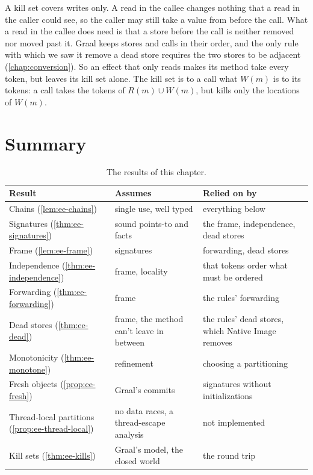 A kill set covers writes only. A read in the callee changes nothing that a
read in the caller could see, so the caller may still take a value from before
the call. What a read in the callee does need is that a store before the call
is neither removed nor moved past it. Graal keeps stores and calls in their
order, and the only rule with which we saw it remove a dead store requires the
two stores to be adjacent (\cref{chap:conversion}). So an effect that only reads
makes its method take every token, but leaves its kill set alone. The kill set
is to a call what $W(m)$ is to its tokens: a call takes the tokens of
$R(m) \cup W(m)$, but kills only the locations of $W(m)$.

\section{Summary}\label{sec:ee-summary}

\begin{table}[t]
\centering
\small
\begin{tabular}{@{}>{\raggedright\arraybackslash}p{}>{\raggedright\arraybackslash}p{}>{\raggedright\arraybackslash}p{}@{}}
\toprule
Result & Assumes & Relied on by \\
\midrule
Chains (\ref{lem:ee-chains}) & single use, well typed & everything below \\
Signatures (\ref{thm:ee-signatures}) & sound points-to and facts & the frame, independence, dead stores \\
Frame (\ref{lem:ee-frame}) & signatures & forwarding, dead stores \\
Independence (\ref{thm:ee-independence}) & frame, locality & that tokens order what must be ordered \\
Forwarding (\ref{thm:ee-forwarding}) & frame & the rules' forwarding \\
Dead stores (\ref{thm:ee-dead}) & frame, the method can't leave in between & the rules' dead stores, which Native Image removes \\
Monotonicity (\ref{thm:ee-monotone}) & refinement & choosing a partitioning \\
Fresh objects (\ref{prop:ee-fresh}) & Graal's commits & signatures without initializations \\
Thread-local partitions (\ref{prop:ee-thread-local}) & no data races, a thread-escape analysis & not implemented \\
Kill sets (\ref{thm:ee-kills}) & Graal's model, the closed world & the round trip \\
\bottomrule
\end{tabular}
\caption{The results of this chapter.}
\label{tab:ee-summary}
\end{table}

